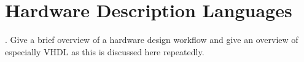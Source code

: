 \chapter{Hardware Description Languages}
. Give a brief overview of a hardware design workflow and give
an overview of especially VHDL as this is discussed here repeatedly.

